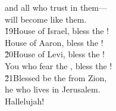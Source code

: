 \begin{poetry}
\poemll    and all who trust in them--- \\
\poemlll       will become like them. \\
\poeml \v{19}House of Israel, bless the ! \\
\poemll    House of Aaron, bless the ! \\
\poeml \v{20}House of Levi, bless the ! \\
\poemll    You who fear the , bless the ! \\
\poeml \v{21}Blessed be the  from Zion, \\
\poemll    he who lives in Jerusalem. \\
\poeml Hallelujah!
\end{poetry}

